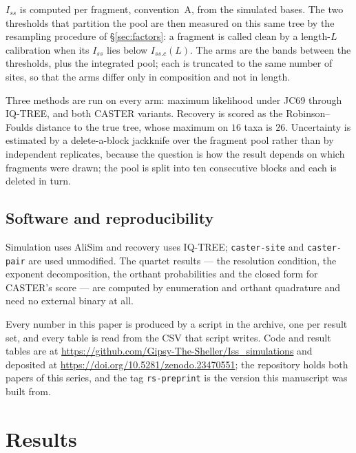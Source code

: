 \documentclass[preprint,12pt,authoryear]{elsarticle}
\newcommand{\Iss}{I_{ss}}
\newcommand{\Issc}{I_{ss.c}}
\theoremstyle{definition}
\theoremstyle{remark}
\begin{document}
$\Iss$ is computed per fragment, convention~A, from the simulated bases.
The two thresholds that partition the pool are then measured on this same
tree by the resampling procedure of \S\ref{sec:factors}: a fragment is
called clean by a length-$L$ calibration when its $\Iss$ lies below
$\Issc(L)$. The arms are the bands between the thresholds, plus the
integrated pool; each is truncated to the same number of sites, so that the
arms differ only in composition and not in length.

Three methods are run on every arm: maximum likelihood under JC69 through
IQ-TREE, and both CASTER variants. Recovery is scored as the
Robinson--Foulds distance to the true tree, whose maximum on $16$ taxa is
$26$. Uncertainty is estimated by a delete-a-block jackknife over the
fragment pool rather than by independent replicates, because the question is
how the result depends on which fragments were drawn; the pool is split into
ten consecutive blocks and each is deleted in turn.

\subsection{Software and reproducibility}
\label{sec:software}

Simulation uses AliSim and recovery uses IQ-TREE; \texttt{caster-site} and
\texttt{caster-pair} are used unmodified. The quartet results --- the
resolution condition, the exponent decomposition, the orthant probabilities
and the closed form for CASTER's score --- are computed by enumeration and
orthant quadrature and need no external binary at all.

Every number in this paper is produced by a script in the archive, one per
result set, and every table is read from the CSV that script writes. Code
and result tables are at
\url{https://github.com/Gipsy-The-Sheller/Iss_simulations} and deposited at
\url{https://doi.org/10.5281/zenodo.23470551}; the repository holds both
papers of this series, and the tag \texttt{rs-preprint} is the version this
manuscript was built from.

\section{Results}
\label{sec:results}

\end{document}
